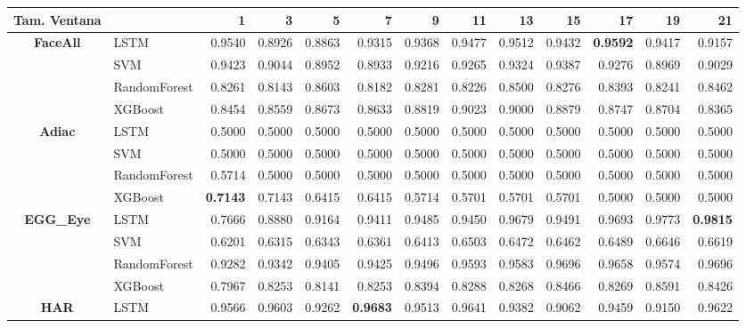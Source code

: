 \begin{table}[h]
\centering
\begin{adjustbox}{max width=15cm}
\begin{tabular}{|c|l|r|r|r|r|r|r|r|r|r|r|r|}
	\hline
	\textbf{Tam. Ventana}&         &      1  &      3  &      5  &      7  &      9  &      11 &      13 &      15 &      17 &      19 &      21 \\
	\hline
	\textbf{FaceAll} & LSTM &  0.9540 &  0.8926 &  0.8863 &  0.9315 &  0.9368 &  0.9477 &  0.9512 &  0.9432 &  \textbf{0.9592} &  0.9417 &  0.9157 \\
	& SVM &  0.9423 &  0.9044 &  0.8952 &  0.8933 &  0.9216 &  0.9265 &  0.9324 &  0.9387 &  0.9276 &  0.8969 &  0.9029 \\
	& RandomForest &  0.8261 &  0.8143 &  0.8603 &  0.8182 &  0.8281 &  0.8226 &  0.8500 &  0.8276 &  0.8393 &  0.8241 &  0.8462 \\
	& XGBoost &  0.8454 &  0.8559 &  0.8673 &  0.8633 &  0.8819 &  0.9023 &  0.9000 &  0.8879 &  0.8747 &  0.8704 &  0.8365 \\
	\hline
	\textbf{Adiac} & LSTM &  0.5000 &  0.5000 &  0.5000 &  0.5000 &  0.5000 &  0.5000 &  0.5000 &  0.5000 &  0.5000 &  0.5000 &  0.5000 \\
	& SVM &  0.5000 &  0.5000 &  0.5000 &  0.5000 &  0.5000 &  0.5000 &  0.5000 &  0.5000 &  0.5000 &  0.5000 &  0.5000 \\
	& RandomForest &  0.5714 &  0.5000 &  0.5000 &  0.5000 &  0.5000 &  0.5000 &  0.5000 &  0.5000 &  0.5000 &  0.5000 &  0.5000 \\
	& XGBoost &  \textbf{0.7143} &  0.7143 &  0.6415 &  0.6415 &  0.5714 &  0.5701 &  0.5701 &  0.5701 &  0.5000 &  0.5000 &  0.5000 \\
	\hline
	\textbf{EGG\_Eye} & LSTM &  0.7666 &  0.8880 &  0.9164 &  0.9411 &  0.9485 &  0.9450 &  0.9679 &  0.9491 &  0.9693 &  0.9773 &  \textbf{0.9815} \\
	& SVM &  0.6201 &  0.6315 &  0.6343 &  0.6361 &  0.6413 &  0.6503 &  0.6472 &  0.6462 &  0.6489 &  0.6646 &  0.6619 \\
	& RandomForest &  0.9282 &  0.9342 &  0.9405 &  0.9425 &  0.9496 &  0.9593 &  0.9583 &  0.9696 &  0.9658 &  0.9574 &  0.9696 \\
	& XGBoost &  0.7967 &  0.8253 &  0.8141 &  0.8253 &  0.8394 &  0.8288 &  0.8268 &  0.8466 &  0.8269 &  0.8591 &  0.8426 \\
	\hline
	\textbf{HAR} & LSTM &  0.9566 &  0.9603 &  0.9262 &  \textbf{0.9683} &  0.9513 &  0.9641 &  0.9382 &  0.9062 &  0.9459 &  0.9150 &  0.9622 \\

\end{tabular}
\end{adjustbox}
\end{table}
